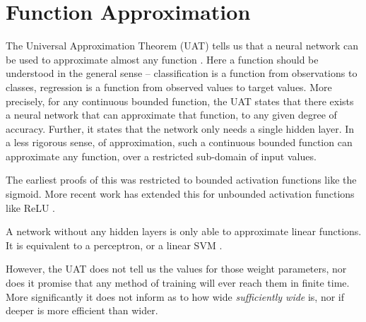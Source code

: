 \documentclass[12pt,parskip]{komatufte}
\begin{document}



\section{Function Approximation}
The Universal Approximation Theorem (UAT) tells us that a neural network can be used to approximate almost any function \parencite{mhaskar1992uat,leshno1993uat,SONODA2017uat}.
Here a function should be understood in the general sense -- classification is a function from observations to classes, regression is a function from observed values to target values.
More precisely, for any continuous bounded function,
the UAT states that there exists a neural network that can approximate that function, to any given degree of accuracy.
Further, it states that the network only needs a single hidden layer.
In a less rigorous sense, of approximation, such a continuous bounded function can approximate any function, over a restricted sub-domain of input values.

The earliest proofs of this was restricted to bounded activation functions like the sigmoid.
More recent work has extended this for unbounded activation functions like ReLU .

A network without any hidden layers is only able to approximate linear functions.
It is equivalent to a perceptron, or a linear SVM \parencite{backprop,minsky2017perceptrons}. 


However, the UAT does not tell us the values for those weight parameters,
nor does it promise that any method of training will ever reach them in finite time.
More significantly it does not inform as to how wide \emph{sufficiently wide} is,
nor if deeper is more efficient than wider.
\end{document}
